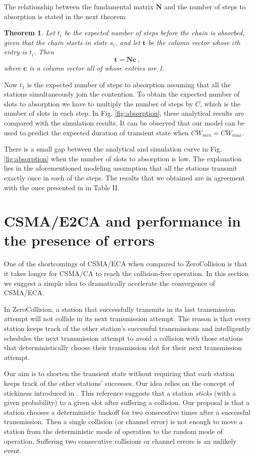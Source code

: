 \documentclass[journal]{IEEEtran}
\newtheorem{theorem}{Theorem}
\begin{document}
The relationship between the fundamental matrix $\mathbf{N}$ and the number of steps to absorption is stated in the next theorem. 

\begin{theorem} Let $t_i$ be the expected number of steps
before
the chain is absorbed, given that the chain starts in state $s_i$, and let
$\mathbf{t}$ 
be the column vector whose $i$th entry is $t_i$. Then
$$\mathbf{t} = \mathbf{N}\mathbf{c}\ ,$$
where $\mathbf{c}$ is a column vector all of whose entries are 1.
\end{theorem}

Now $t_1$ is the expected number of steps to absorption assuming that all the stations simultaneously join the contention. To obtain the expected number of slots to absorption we have to multiply the number of steps by $C$, which is the number of slots in each step. In Fig. \ref{fig:absorption}, these analytical results are compared with the simulation results. It can be observed that our model can be used to predict the expected duration of transient state when $CW_{min}=CW_{max}$. 

There is a small gap between the analytical and simulation curve in Fig.\ref{fig:absorption} when the number of slots to absorption is low. The explanation lies in the aforementioned modeling assumption that all the stations transmit exactly once in each of the steps. The results that we obtained are in agreement with the ones presented in \cite{he2009sbr} in Table II.

\section{CSMA/E2CA and performance in the presence of errors}
\label{sec:e2ca}

One of the shortcomings of CSMA/ECA when compared to ZeroCollision is that it takes longer for CSMA/CA to reach the collision-free operation. In this section we suggest a simple idea to dramatically accelerate the convergence of CSMA/ECA. 


In ZeroCollision, a station that successfully transmits in its last transmission attempt will not collide in its next transmission attempt. The reason is that every station keeps track of the other station's successful transmissions and intelligently schedules the next transmission attempt to avoid a collision with those stations that deterministically choose their transmission slot for their next transmission attempt.

Our aim is to shorten the transient state without requiring that each station keeps track of the other stations' successes. Our idea relies on the concept of stickiness introduced in \cite{fang2009dlm}. This reference suggests that a station \emph{sticks} (with a given probability) to a given slot after suffering a collision. Our proposal is that a station chooses a deterministic backoff for two consecutive times after a successful transmission. Then a single collision (or channel error) is not enough to move a station from the deterministic mode of operation to the random mode of operation. Suffering two consecutive collisions or channel errors is an unlikely event.
\end{document}
